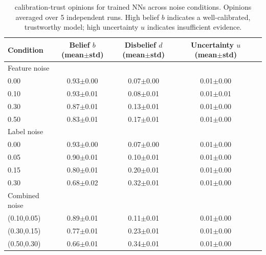 \begin{table}[ht]
\centering
\caption{calibration-trust opinions for trained NNs across noise conditions. Opinions averaged over 5 independent runs. High belief $b$ indicates a well-calibrated, trustworthy model; high uncertainty $u$ indicates insufficient evidence.}
\label{tab:calibration-trust}
\begin{tabular}{lcccc}
\toprule
Condition & Belief $b$ (mean$\pm$std) & Disbelief $d$ (mean$\pm$std) & Uncertainty $u$ (mean$\pm$std)\\
\hline
Feature noise \\
0.00 & 0.93$\pm$0.00 & 0.07$\pm$0.00 & 0.01$\pm$0.00 \\
0.10 & 0.93$\pm$0.01 & 0.08$\pm$0.01 & 0.01$\pm$0.01 \\
0.30 & 0.87$\pm$0.01 & 0.13$\pm$0.01 & 0.01$\pm$0.00 \\
0.50 & 0.83$\pm$0.01 & 0.17$\pm$0.01 & 0.01$\pm$0.00 \\
\hline 
Label noise  \\
0.00 & 0.93$\pm$0.00 & 0.07$\pm$0.00 & 0.01$\pm$0.00 \\
0.05 & 0.90$\pm$0.01 & 0.10$\pm$0.01 & 0.01$\pm$0.00 \\
0.15 & 0.80$\pm$0.01 & 0.20$\pm$0.01 & 0.01$\pm$0.00 \\
0.30 & 0.68$\pm$0.02 & 0.32$\pm$0.01 & 0.01$\pm$0.00\\
\hline
Combined noise \\
(0.10,0.05) & 0.89$\pm$0.01 & 0.11$\pm$0.01 & 0.01$\pm$0.00 \\
(0.30,0.15) & 0.77$\pm$0.01 & 0.23$\pm$0.01 & 0.01$\pm$0.00  \\
(0.50,0.30) & 0.66$\pm$0.01 & 0.34$\pm$0.01 & 0.01$\pm$0.00 \\
\bottomrule
\end{tabular}
\end{table}